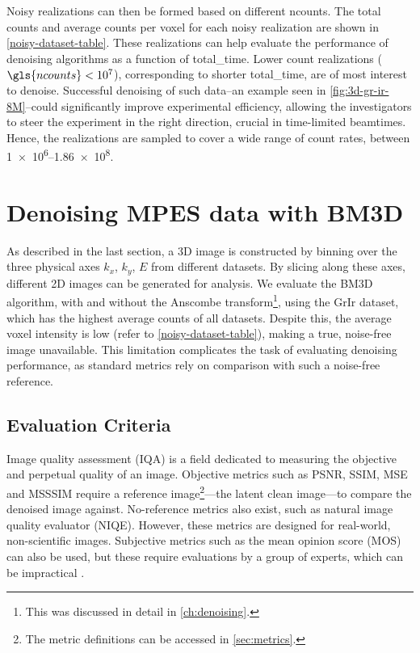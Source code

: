 Noisy realizations can then be formed based on different \gls{ncounts}. The total counts and average counts per voxel for each noisy realization are shown in \cref{noisy-dataset-table}. These realizations can help evaluate the performance of denoising algorithms as a function of \gls{total_time}. Lower count realizations ($\gls{ncounts}<\num{e7}$), corresponding to shorter \gls{total_time}, are of most interest to denoise. Successful denoising of such data--an example seen in \cref{fig:3d-gr-ir-8M}--could significantly improve experimental efficiency, allowing the investigators to steer the experiment in the right direction, crucial in time-limited \glspl{beamtime}. Hence, the realizations are sampled to cover a wide range of count rates, between \numrange{1e6}{1.86e8}.


\section{Denoising MPES data with BM3D}
As described in the last section, a 3D image is constructed by binning over the three physical axes $k_x$, $k_y$, $E$ from different datasets. By slicing along these axes, different 2D images can be generated for analysis. We evaluate the \gls{BM3D} algorithm, with and without the Anscombe transform\footnote{This was discussed in detail in \cref{ch:denoising}.}, using the \gls{GrIr} dataset, which has the highest average counts of all datasets. Despite this, the average voxel intensity is low (refer to \cref{noisy-dataset-table}), making a true, noise-free image unavailable. This limitation complicates the task of evaluating denoising performance, as standard metrics rely on comparison with such a noise-free reference.

\subsection{Evaluation Criteria}
Image quality assessment (IQA) is a field dedicated to measuring the objective and perpetual quality of an image. Objective metrics such as \gls{PSNR}, \gls{SSIM}, \gls{MSE} and \gls{MSSSIM} require a reference image\footnote{The metric definitions can be accessed in \cref{sec:metrics}.}---the latent clean image---to compare the denoised image against. No-reference metrics also exist, such as natural image quality evaluator (NIQE). However, these metrics are designed for real-world, non-scientific images. Subjective metrics such as the mean opinion score (MOS) can also be used, but these require evaluations by a group of experts, which can be impractical \cite{eskiciogluImageQualityMeasures1995,linzhangFSIMFeatureSimilarity2011}.

